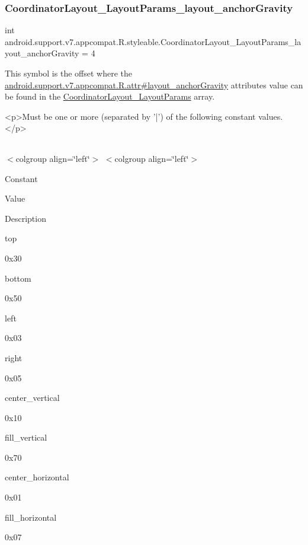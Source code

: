 \subsubsection{\texorpdfstring{Coordinator\+Layout\+\_\+\+Layout\+Params\+\_\+layout\+\_\+anchor\+Gravity}{CoordinatorLayout\_LayoutParams\_layout\_anchorGravity}}
{\footnotesize\ttfamily int android.\+support.\+v7.\+appcompat.\+R.\+styleable.\+Coordinator\+Layout\+\_\+\+Layout\+Params\+\_\+layout\+\_\+anchor\+Gravity = 4\hspace{0.3cm}{\ttfamily [static]}}

This symbol is the offset where the \hyperlink{classandroid_1_1support_1_1v7_1_1appcompat_1_1R_1_1attr_a7746918fec5990cb35abc69535991375}{android.\+support.\+v7.\+appcompat.\+R.\+attr\#layout\+\_\+anchor\+Gravity} attribute\textquotesingle{}s value can be found in the \hyperlink{classandroid_1_1support_1_1v7_1_1appcompat_1_1R_1_1styleable_aa327c121de57ab2e57c054fff5f5c980}{Coordinator\+Layout\+\_\+\+Layout\+Params} array.

\begin{DoxyVerb}      <p>Must be one or more (separated by '|') of the following constant values.</p>
\end{DoxyVerb}
 \tabulinesep=1mm
\begin{longtabu} spread 0pt [c]{*{0}{|X[-1]}|}
\hline
\end{longtabu}
$<$colgroup align=\char`\"{}left\char`\"{}$>$ $<$colgroup align=\char`\"{}left\char`\"{}$>$ 

Constant

Value

Description 

{\ttfamily top}

0x30

{\ttfamily bottom}

0x50

{\ttfamily left}

0x03

{\ttfamily right}

0x05

{\ttfamily center\+\_\+vertical}

0x10

{\ttfamily fill\+\_\+vertical}

0x70

{\ttfamily center\+\_\+horizontal}

0x01

{\ttfamily fill\+\_\+horizontal}

0x07


